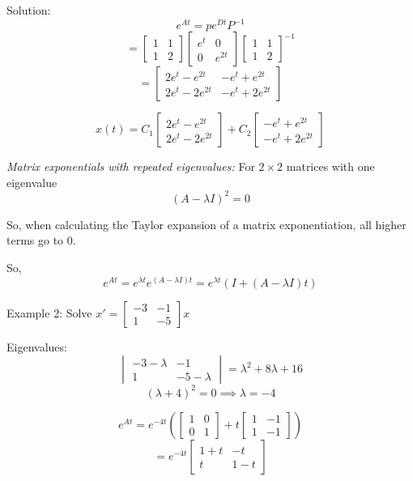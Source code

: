 \documentclass[12pt]{article}
\begin{document}
Solution:
\[e^{At} = pe^{Dt}P^{-1}\]
\[ = \begin{bmatrix}
    1 & 1\\
    1 & 2
\end{bmatrix} \begin{bmatrix}
    e^t & 0\\
    0 & e^{2t}
\end{bmatrix} \begin{bmatrix}
    1 & 1\\
    1 & 2
\end{bmatrix}^{-1}\]
\[= \begin{bmatrix}
    2e^t - e^{2t} & -e^t + e^{2t}\\
    2e^t - 2e^{2t} & -e^t + 2e^{2t}
\end{bmatrix}\]

\[\boxed{x(t) = C_1 \begin{bmatrix}
    2e^t - e^{2t}\\
    2e^t - 2e^{2t}
\end{bmatrix} + C_2 \begin{bmatrix}
    -e^t + e^{2t}\\
    -e^t + 2e^{2t}
\end{bmatrix}}\]

\emph{Matrix exponentials with repeated eigenvalues:}
For $2 \times 2$ matrices with one eigenvalue 
\[(A - \lambda I)^2 = 0\]

So, when calculating the Taylor expansion of a matrix exponentiation, all higher terms go to 0. 

So, 
\[e^{At} = e^{\lambda t}e^{(A - \lambda I) t} = e^{\lambda t} \left(I + (A - \lambda I)t\right)\]

Example 2: Solve $x' = \begin{bmatrix}
    -3 & -1\\
    1 & -5
\end{bmatrix}x$

Eigenvalues:
\[\begin{vmatrix}
    -3 - \lambda & -1\\
    1 & -5 - \lambda
\end{vmatrix} = \lambda^2 + 8\lambda + 16\]
\[(\lambda + 4)^2 = 0 \implies \lambda = -4\]

\[e^{At} = e^{-4t}\left(\begin{bmatrix}
    1 & 0\\
    0 & 1
\end{bmatrix} + t\begin{bmatrix}
    1 & -1\\
    1 & -1
\end{bmatrix}\right)\]
\[= e^{-4t} \begin{bmatrix}
    1 + t & -t\\
    t & 1 -t
\end{bmatrix}\]
\end{document}
